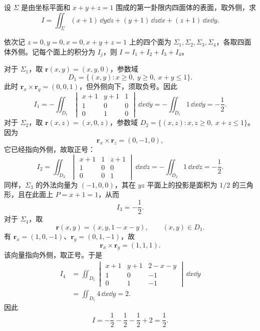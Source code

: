 \begin{example}
设 $\Sigma$ 是由坐标平面和 $x+y+z=1$ 围成的第一卦限内四面体的表面，取外侧，求
\[
I=\displaystyle\iint_\Sigma(x+1)\,\dd y\dd z+(y+1)\,\dd z\dd x+(z+1)\,\dd x\dd y.
\]
\end{example}
\begin{solution}
依次记 $z=0,y=0,x=0,x+y+z=1$ 上的四个面为 $\Sigma_1,\Sigma_2,\Sigma_3,\Sigma_4$，各取四面体外侧。记每个面上的积分为 $I_j$，则 $I=I_1+I_2+I_3+I_4$。

对于 $\Sigma_1$，取 $\boldsymbol r(x,y)=(x,y,0)$，参数域
\[
D_1=\{(x,y):x\ge0,\ y\ge0,\ x+y\le1\}.
\]
此时 $\boldsymbol r_x\times\boldsymbol r_y=(0,0,1)$，但外侧向下，须取负号。因此
\[
I_1=-\displaystyle\iint_{D_1}
\begin{vmatrix}x+1&y+1&1\\1&0&0\\0&1&0\end{vmatrix}\,\dd x\dd y
=-\displaystyle\iint_{D_1}1\,\dd x\dd y=-\frac12.
\]
对于 $\Sigma_2$，取 $\boldsymbol r(x,z)=(x,0,z)$，参数域 $D_2=\{(x,z):x,z\ge0,\ x+z\le1\}$。因为
\[
\boldsymbol r_x\times\boldsymbol r_z=(0,-1,0),
\]
它已经指向外侧，故取正号：
\[
I_2=\displaystyle\iint_{D_2}
\begin{vmatrix}x+1&1&z+1\\1&0&0\\0&0&1\end{vmatrix}\,\dd x\dd z
=-\displaystyle\iint_{D_2}1\,\dd x\dd z=-\frac12.
\]
同样，$\Sigma_3$ 的外法向量为 $(-1,0,0)$，其在 $yz$ 平面上的投影是面积为 $1/2$ 的三角形，且在此面上 $P=x+1=1$，从而
\[
I_3=-\frac12.
\]
对于 $\Sigma_4$，取
\[
\boldsymbol r(x,y)=(x,y,1-x-y),\qquad (x,y)\in D_1.
\]
有 $\boldsymbol r_x=(1,0,-1)$、$\boldsymbol r_y=(0,1,-1)$，故
\[
\boldsymbol r_x\times\boldsymbol r_y=(1,1,1).
\]
该向量指向外侧，取正号。于是
\begin{align*}
I_4&=\displaystyle\iint_{D_1}
\begin{vmatrix}x+1&y+1&2-x-y\\1&0&-1\\0&1&-1\end{vmatrix}\,\dd x\dd y\\
&=\displaystyle\iint_{D_1}4\,\dd x\dd y=2.
\end{align*}
因此
\[
I=-\frac12-\frac12-\frac12+2=\frac12.
\]
\end{solution}
